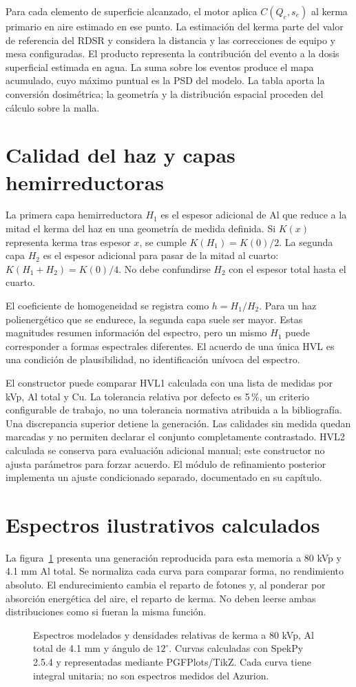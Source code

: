 Para cada elemento de superficie alcanzado, el motor aplica $C(Q_e,s_e)$ al kerma primario en aire estimado en ese punto. La estimación del kerma parte del valor de referencia del RDSR y considera la distancia y las correcciones de equipo y mesa configuradas. El producto representa la contribución del evento a la dosis superficial estimada en agua. La suma sobre los eventos produce el mapa acumulado, cuyo máximo puntual es la PSD del modelo. La tabla aporta la conversión dosimétrica; la geometría y la distribución espacial proceden del cálculo sobre la malla.

\section{Calidad del haz y capas hemirreductoras}
La primera capa hemirreductora $H_1$ es el espesor adicional de Al que reduce a la mitad el kerma del haz en una geometría de medida definida. Si $K(x)$ representa kerma tras espesor $x$, se cumple $K(H_1)=K(0)/2$. La segunda capa $H_2$ es el espesor adicional para pasar de la mitad al cuarto: $K(H_1+H_2)=K(0)/4$. No debe confundirse $H_2$ con el espesor total hasta el cuarto.

El coeficiente de homogeneidad se registra como $h=H_1/H_2$. Para un haz polienergético que se endurece, la segunda capa suele ser mayor. Estas magnitudes resumen información del espectro, pero un mismo $H_1$ puede corresponder a formas espectrales diferentes. El acuerdo de una única HVL es una condición de plausibilidad, no identificación unívoca del espectro.

El constructor puede comparar HVL1 calculada con una lista de medidas por kVp, Al total y Cu. La tolerancia relativa por defecto es 5\,\%, un criterio configurable de trabajo, no una tolerancia normativa atribuida a la bibliografía. Una discrepancia superior detiene la generación. Las calidades sin medida quedan marcadas y no permiten declarar el conjunto completamente contrastado. HVL2 calculada se conserva para evaluación adicional manual; este constructor no ajusta parámetros para forzar acuerdo. El módulo de refinamiento posterior implementa un ajuste condicionado separado, documentado en su capítulo.

\section{Espectros ilustrativos calculados}
La figura~\ref{fig:spectra} presenta una generación reproducida para esta memoria a 80 kVp y \num{4.1} mm Al total. Se normaliza cada curva para comparar forma, no rendimiento absoluto. El endurecimiento cambia el reparto de fotones y, al ponderar por absorción energética del aire, el reparto de kerma. No deben leerse ambas distribuciones como si fueran la misma función.
\begin{figure}[p]\centering

\caption{Espectros modelados y densidades relativas de kerma a 80 kVp, Al total de \num{4.1} mm y ángulo de $12^\circ$. Curvas calculadas con SpekPy 2.5.4 y representadas mediante PGFPlots/TikZ. Cada curva tiene integral unitaria; no son espectros medidos del Azurion.}\label{fig:spectra}
\end{figure}


